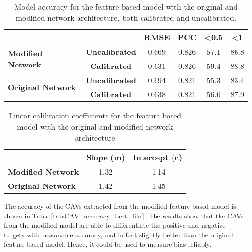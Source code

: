 \begin{table}[H]
    \centering
    \begin{tabular}{|lc|c|c|c|c|}
        \hline
        \multicolumn{2}{|l|}{\textbf{}}                                  & \textbf{RMSE}         & \textbf{PCC} & \textbf{\textless 0.5} & \textbf{\textless 1}        \\ \hline
        \multicolumn{1}{|l|}{\multirow{2}{*}{\textbf{Modified Network}}} & \textbf{Uncalibrated} & 0.669        & 0.826                  & 57.1                 & 86.8 \\ \cline{2-6}
        \multicolumn{1}{|l|}{}                                           & \textbf{Calibrated}   & 0.631        & 0.826                  & 59.4                 & 88.8 \\ \hline
        \multicolumn{1}{|l|}{\multirow{2}{*}{\textbf{Original Network}}} & \textbf{Uncalibrated} & 0.694        & 0.821                  & 55.3                 & 83.4 \\ \cline{2-6}
        \multicolumn{1}{|l|}{}                                           & \textbf{Calibrated}   & 0.638        & 0.821                  & 56.6                 & 87.9 \\ \hline
    \end{tabular}
    \caption{Model accuracy for the feature-based model with the original and modified network architecture, both calibrated and uncalibrated.}
    \label{tab:model_accuracy_bert_like}
\end{table}

\begin{table}[H]
    \centering
    \begin{tabular}{|l|c|c|}
        \hline
        \textbf{}                 & \textbf{Slope (m)} & \textbf{Intercept (c)} \\ \hline
        \textbf{Modified Network} & 1.32               & -1.14                  \\ \hline
        \textbf{Original Network} & 1.42               & -1.45                  \\ \hline
    \end{tabular}
    \caption{Linear calibration coefficients for the feature-based model with the original and modified network architecture}
    \label{tab:linear_regression_coefficients_bert_like}
\end{table}

The accuracy of the CAVs extracted from the modified feature-based model is shown in Table \ref{tab:CAV_accuracy_bert_like}. The results show that the CAVs from the modified model are able to differentiate the positive and negative targets with reasonable accuracy, and in fact slightly better than the original feature-based model. Hence, it could be used to measure bias reliably.


